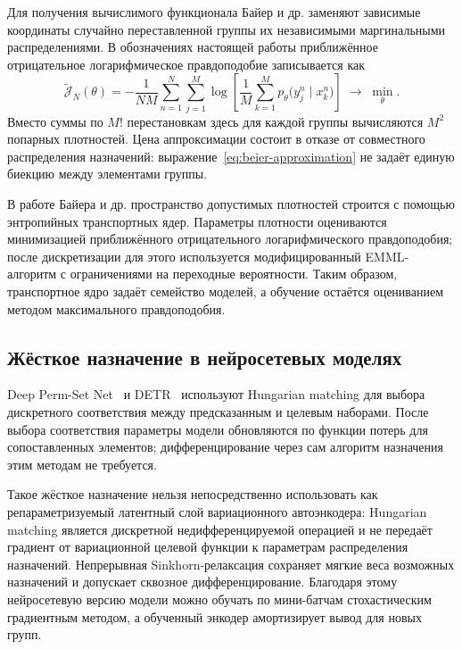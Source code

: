 Для получения вычислимого функционала Байер и др. заменяют зависимые координаты случайно
переставленной группы их независимыми маргинальными распределениями. В обозначениях
настоящей работы приближённое отрицательное логарифмическое правдоподобие записывается как
\begin{equation}
\widetilde{\mathcal{J}}_N(\theta)
=-\frac{1}{NM}\sum_{n=1}^{N}\sum_{j=1}^{M}
\log\left[
\frac{1}{M}\sum_{k=1}^{M}p_\theta\bigl(y^n_j\mid x^n_k\bigr)
\right]
\;\longrightarrow\;\min_\theta.
\label{eq:beier-approximation}
\end{equation}
Вместо суммы по $M!$ перестановкам здесь для каждой группы вычисляются $M^2$ попарных
плотностей. Цена аппроксимации состоит в отказе от совместного распределения назначений:
выражение~\eqref{eq:beier-approximation} не задаёт единую биекцию между элементами группы.

В работе Байера и др. пространство допустимых плотностей строится с помощью энтропийных
транспортных ядер. Параметры плотности оцениваются минимизацией приближённого отрицательного
логарифмического правдоподобия; после дискретизации для этого используется модифицированный
EMML-алгоритм с ограничениями на переходные вероятности. Таким образом, транспортное ядро
задаёт семейство моделей, а обучение остаётся оцениванием методом максимального
правдоподобия.

\subsection{Жёсткое назначение в нейросетевых моделях}

Deep Perm-Set Net~\cite{rezatofighi2018perm} и DETR~\cite{carion2020detr} используют
Hungarian matching для выбора дискретного соответствия между предсказанным и целевым
наборами. После выбора соответствия параметры модели обновляются по функции потерь для
сопоставленных элементов; дифференцирование через сам алгоритм назначения этим методам не
требуется.

Такое жёсткое назначение нельзя непосредственно использовать как репараметризуемый
латентный слой вариационного автоэнкодера: Hungarian matching является дискретной
недифференцируемой операцией и не передаёт градиент от вариационной целевой функции к
параметрам распределения назначений. Непрерывная Sinkhorn-релаксация сохраняет мягкие веса
возможных назначений и допускает сквозное дифференцирование. Благодаря этому нейросетевую
версию модели можно обучать по мини-батчам стохастическим градиентным методом, а обученный
энкодер амортизирует вывод для новых групп.
